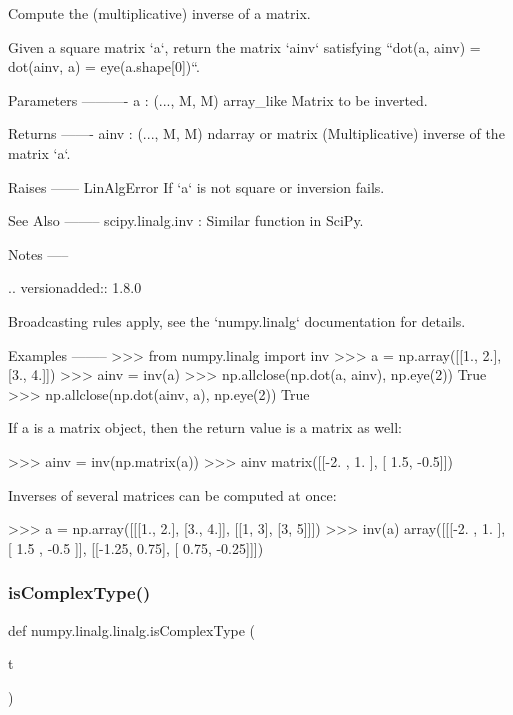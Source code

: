 \begin{DoxyVerb}Compute the (multiplicative) inverse of a matrix.

Given a square matrix `a`, return the matrix `ainv` satisfying
``dot(a, ainv) = dot(ainv, a) = eye(a.shape[0])``.

Parameters
----------
a : (..., M, M) array_like
    Matrix to be inverted.

Returns
-------
ainv : (..., M, M) ndarray or matrix
    (Multiplicative) inverse of the matrix `a`.

Raises
------
LinAlgError
    If `a` is not square or inversion fails.

See Also
--------
scipy.linalg.inv : Similar function in SciPy.

Notes
-----

.. versionadded:: 1.8.0

Broadcasting rules apply, see the `numpy.linalg` documentation for
details.

Examples
--------
>>> from numpy.linalg import inv
>>> a = np.array([[1., 2.], [3., 4.]])
>>> ainv = inv(a)
>>> np.allclose(np.dot(a, ainv), np.eye(2))
True
>>> np.allclose(np.dot(ainv, a), np.eye(2))
True

If a is a matrix object, then the return value is a matrix as well:

>>> ainv = inv(np.matrix(a))
>>> ainv
matrix([[-2. ,  1. ],
        [ 1.5, -0.5]])

Inverses of several matrices can be computed at once:

>>> a = np.array([[[1., 2.], [3., 4.]], [[1, 3], [3, 5]]])
>>> inv(a)
array([[[-2.  ,  1.  ],
        [ 1.5 , -0.5 ]],
       [[-1.25,  0.75],
        [ 0.75, -0.25]]])\end{DoxyVerb}
 \mbox{\label{namespacenumpy_1_1linalg_1_1linalg_a212f5e5d2c0cff3ae7f771126dc96522}} 
\subsubsection{\texorpdfstring{is\+Complex\+Type()}{isComplexType()}}
{\footnotesize\ttfamily def numpy.\+linalg.\+linalg.\+is\+Complex\+Type (\begin{DoxyParamCaption}\item[{}]{t }\end{DoxyParamCaption})}

